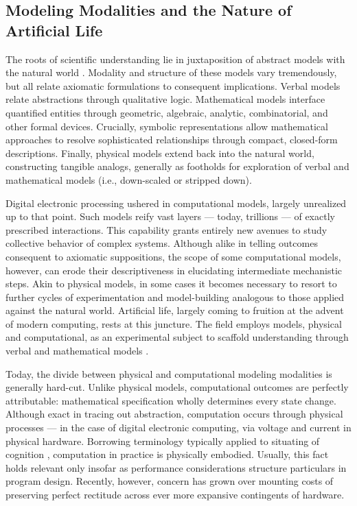 \subsection{Modeling Modalities and the Nature of Artificial Life}

The roots of scientific understanding lie in juxtaposition of abstract models with the natural world \citep{banzhaf2016defining}.
Modality and structure of these models vary tremendously, but all relate axiomatic formulations to consequent implications.
Verbal models relate abstractions through qualitative logic.
Mathematical models interface quantified entities through geometric, algebraic, analytic, combinatorial, and other formal devices.
Crucially, symbolic representations allow mathematical approaches to resolve sophisticated relationships through compact, closed-form descriptions.
Finally, physical models extend back into the natural world, constructing tangible analogs, generally as footholds for exploration of verbal and mathematical models (i.e., down-scaled or stripped down).

Digital electronic processing ushered in computational models, largely unrealized up to that point.
Such models reify vast layers --- today, trillions --- of exactly prescribed interactions.
This capability grants entirely new avenues to study collective behavior of complex systems.
Although alike in telling outcomes consequent to axiomatic suppositions, the scope of some computational models, however, can erode their descriptiveness in elucidating intermediate mechanistic steps.
Akin to physical models, in some cases it becomes necessary to resort to further cycles of experimentation and model-building analogous to those applied against the natural world.
Artificial life, largely coming to fruition at the advent of modern computing, rests at this juncture.
The field employs models, physical and computational, as an experimental subject to scaffold understanding through verbal and mathematical models \citep{bedau2003artificial}.

Today, the divide between physical and computational modeling modalities is generally hard-cut.
Unlike physical models, computational outcomes are perfectly attributable: mathematical specification wholly determines every state change.
Although exact in tracing out abstraction, computation occurs through physical processes --- in the case of digital electronic computing, via voltage and current in physical hardware.
Borrowing terminology typically applied to situating of cognition \citep{etxeberria1998embodiment}, computation in practice is physically embodied.
Usually, this fact holds relevant only insofar as performance considerations structure particulars in program design.
Recently, however, concern has grown over mounting costs of preserving perfect rectitude across ever more expansive contingents of hardware.


